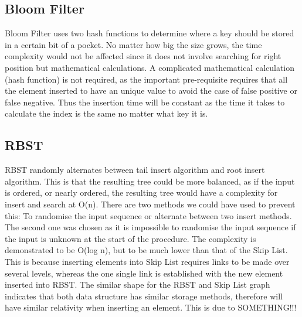 \documentclass[11pt]{article}
\begin{document}
\subsection*{Bloom Filter}
Bloom Filter uses two hash functions to determine where a key should be stored in a certain bit of a pocket. No matter how big the size grows, the time complexity would not be affected since it does not involve searching for right position but mathematical calculations. A complicated mathematical calculation (hash function) is not required, as the important pre-requisite requires that all the element inserted to have an unique value to avoid the case of false positive or false negative. Thus the insertion time will be constant as the time it takes to calculate the index is the same no matter what key it is. 
\subsection*{RBST}
RBST randomly alternates between tail insert algorithm and root insert algorithm. This is that the resulting tree could be more balanced, as if the input is ordered, or nearly ordered, the resulting tree would have a complexity for insert and search at O(n). There are two methods we could have used to prevent this: To randomise the input sequence or alternate between two insert methods. The second one was chosen as it is impossible to randomise the input sequence if the input is unknown at the start of the procedure. The complexity is demonstrated to be O(log n), but to be much lower than that of the Skip List. This is because inserting elements into Skip List requires links to be made over several levels, whereas the one single link is established with the new element inserted into RBST. The similar shape for the RBST and Skip List graph indicates that both data structure has similar storage methods, therefore will have similar relativity when inserting an element. This is due to SOMETHING!!!
\end{document}
